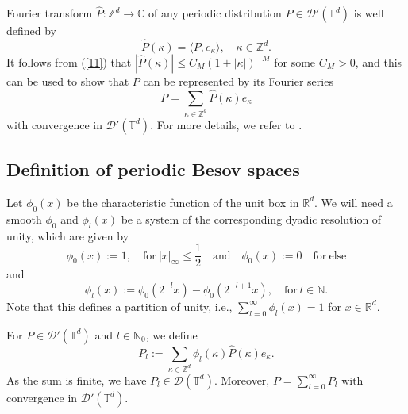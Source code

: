 \documentclass[10pt]{iopart}
\begin{document}
Fourier transform $\widehat{P}:\mathbb{Z}^d\to \mathbb{C}$ of any periodic distribution 
$P\in\mathscr{D}'(\mathbb{T}^{d})$ is well defined by 
\begin{equation*}
\widehat{P}(\kappa)=\langle P, e_{\kappa}\rangle, \quad \kappa\in \mathbb{Z}^{d}.
\end{equation*}
It follows from (\ref{11}) that $|\widehat{P}(\kappa)|\leq C_{M}(1+|\kappa|)^{-M}$ for some $C_{M}>0$, and this can be used to show that $P$ 
can be represented by its Fourier series
\begin{equation*}
P=\sum_{\kappa\in\mathbb{Z}^{d}}\widehat{P}(\kappa)e_{\kappa}
\end{equation*}
with convergence in $\mathscr{D}'(\mathbb{T}^{d})$. For more details, we refer to \cite{Grafakos2009, Schmeisser1987}. 


\subsection{Definition of periodic Besov spaces} 

Let $\phi_{0}(x)$ be the characteristic function of the unit box in $\mathbb{R}^{d}$. We will need a smooth $\phi_0$
and $\phi_{l}(x)$ be a system of the corresponding dyadic resolution of unity, which are given by
\begin{equation*}
\phi_{0}(x):=1, \quad\text{for}~ |x|_{\infty}\leq \frac{1}{2} \quad\text{and}\quad \phi_{0}(x):=0\quad \text{for}~ \text{else}
\end{equation*}
and 
\begin{equation*}
\phi_{l}(x):=\phi_{0}(2^{-l}x)-\phi_{0}(2^{-l+1}x), \quad\text{for}~ l\in\mathbb{N}.
\end{equation*}
Note that this defines a partition of unity, i.e., $\sum_{l=0}^{\infty}\phi_{l}(x)=1$ for $x\in\mathbb{R}^{d}$.

For $P\in\mathscr{D}'(\mathbb{T}^{d})$ and $l\in\mathbb{N}_0$, we define
\begin{equation}\label{12}
P_{l}:=\sum_{\kappa\in\mathbb{Z}^{d}}\phi_{l}(\kappa)\widehat{P}(\kappa)e_{\kappa}.
\end{equation}
As the sum is finite, we have $P_{l}\in\mathscr{D}(\mathbb{T}^{d})$. Moreover, 
$P = \sum_{l=0}^\infty P_l$ with convergence in $\mathscr{D}'(\mathbb{T}^{d})$.
\end{document}
